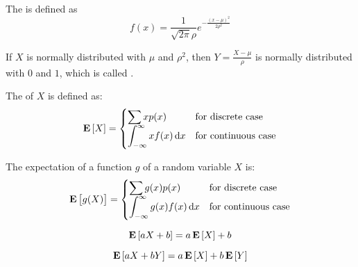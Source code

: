 \begin{definition}
    The  is defined as
    \begin{equation}
        f(x) = \frac{1}{\sqrt{2 \pi} \rho } e^{- \frac{(x - \mu )^2}{2 \rho^2}}
    \end{equation}
\end{definition}

If $X$ is normally distributed with $\mu$ and $\rho^2$, then $Y =\displaystyle \frac{X - \mu}{\rho}$ is normally distributed with $0$ and $1$, which is called .



\begin{definition}[expectation]
    The  of $X$ is defined as:
    \begin{equation}
        \expect{X} = \begin{cases}
            \displaystyle \sum x p(x) & \text{for discrete case} \\
            \displaystyle \int_{-\infty}^{\infty} x f(x) \dif{x} & \text{for continuous case}
        \end{cases}
    \end{equation}
\end{definition}




\begin{theorem}
    The expectation of a function $g$  of a random variable $X$ is:
    \begin{equation}
        \expect{g(X)} = \begin{cases}
            \displaystyle \sum g(x) p(x) & \text{for discrete case} \\
            \displaystyle \int_{-\infty}^{\infty} g(x) f(x) \dif{x} & \text{for continuous case}
        \end{cases}
    \end{equation}
\end{theorem}


\begin{theorem}
    \begin{equation}
        \mathop{\bf E\/} \left[ aX + b \right] = a \mathop{\bf E\/} \left[ X \right] + b
    \end{equation}    
\end{theorem}

\begin{theorem}
    \begin{equation}
        \mathop{\bf E\/} \left[ aX + bY \right] = a \mathop{\bf E\/} \left[ X \right] + b \mathop{\bf E\/} \left[ Y \right]
    \end{equation}    
\end{theorem}



